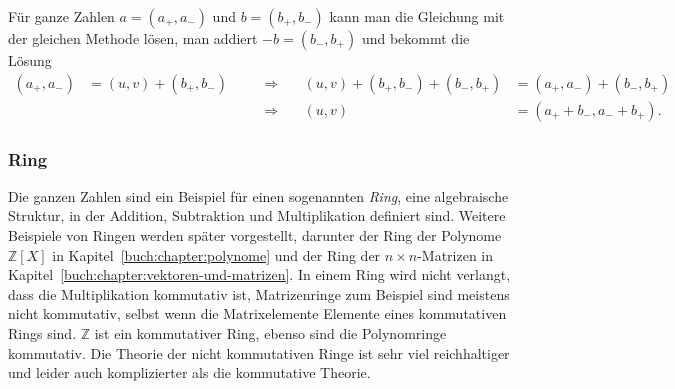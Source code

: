 Für ganze Zahlen $a=(a_+,a_-)$ und $b=(b_+,b_-)$ kann man die Gleichung
mit der gleichen Methode lösen, man addiert $-b=(b_-,b_+)$ und bekommt
die Lösung
\[
\begin{aligned}
(a_+,a_-) &= (u,v) + (b_+,b_-)
&
\quad &\Rightarrow \quad
&
(u,v)+(b_+,b_-) + (b_-,b_+)
&=
(a_+,a_-) + (b_-,b_+)
\\
&&
\quad &\Rightarrow \quad
&
(u,v) &= (a_++b_-,a_-+b_+).
\end{aligned}
\]

\subsubsection{Ring}
%
Die ganzen Zahlen sind ein Beispiel für einen sogenannten {\em Ring},
%
eine algebraische Struktur, in der Addition, Subtraktion und
Multiplikation definiert sind.
Weitere Beispiele von Ringen werden später vorgestellt,
darunter
der Ring der Polynome $\mathbb{Z}[X]$ in Kapitel~\ref{buch:chapter:polynome}
%
und
der Ring der $n\times n$-Matrizen in
%
Kapitel~\ref{buch:chapter:vektoren-und-matrizen}.
In einem Ring wird nicht verlangt, dass die Multiplikation kommutativ
ist, Matrizenringe zum Beispiel sind meistens nicht kommutativ, selbst
wenn die Matrixelemente Elemente eines kommutativen Rings sind.
$\mathbb{Z}$ ist ein kommutativer Ring, ebenso sind die Polynomringe 
kommutativ.
Die Theorie der nicht kommutativen Ringe ist sehr viel reichhaltiger
und leider auch komplizierter als die kommutative Theorie.
%





